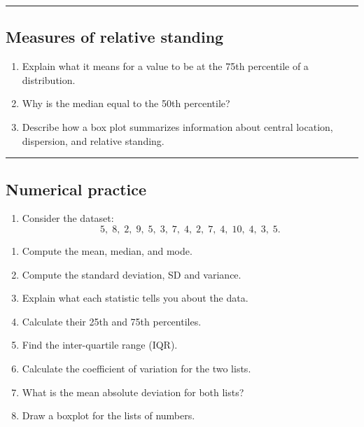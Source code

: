 \documentclass[
  letterpaper,
  DIV=11,
  numbers=noendperiod]{scrreprt}
\providecommand{\tightlist}{%
  \setlength{\itemsep}{0pt}\setlength{\parskip}{0pt}}
\begin{document}
\begin{center}\rule{0.5\linewidth}{0.5pt}\end{center}

\subsection{Measures of relative
standing}\label{measures-of-relative-standing-1}

\begin{enumerate}
\def\labelenumi{\arabic{enumi}.}
\setcounter{enumi}{11}
\item
  Explain what it means for a value to be at the 75th percentile of a
  distribution.
\item
  Why is the median equal to the 50th percentile?
\item
  Describe how a box plot summarizes information about central location,
  dispersion, and relative standing.
\end{enumerate}

\begin{center}\rule{0.5\linewidth}{0.5pt}\end{center}

\subsection{Numerical practice}\label{numerical-practice}

\begin{enumerate}
\def\labelenumi{\arabic{enumi}.}
\setcounter{enumi}{14}
\tightlist
\item
  Consider the dataset: \[
  5,\; 8,\; 2,\; 9,\; 5,\; 3,\; 7,\; 4,\; 2,\; 7,\; 4,\; 10,\; 4,\; 3,\; 5.
  \]
\end{enumerate}

\begin{enumerate}
\def\labelenumi{\alph{enumi}.}
\tightlist
\item
  Compute the mean, median, and mode.\\
\item
  Compute the standard deviation, SD and variance.\\
\item
  Explain what each statistic tells you about the data.\\
\item
  Calculate their 25th and 75th percentiles.\\
\item
  Find the inter-quartile range (IQR).\\
\item
  Calculate the coefficient of variation for the two lists.\\
\item
  What is the mean absolute deviation for both lists?\\
\item
  Draw a boxplot for the lists of numbers.
\end{enumerate}
\end{document}
